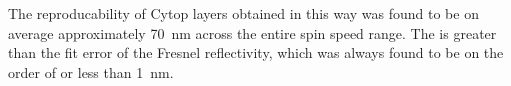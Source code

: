 The reproducability of Cytop layers obtained in this way was found to be on
average approximately \SI{70}{\nano\meter} across the entire spin speed range.
The is greater than the fit error of the Fresnel reflectivity, which was
always found to be on the order of or less than \SI{1}{\nano\meter}.


